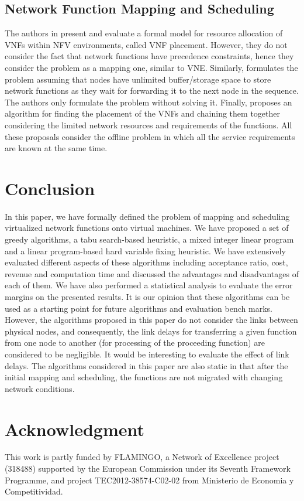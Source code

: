 \documentclass[conference]{IEEEtran}
\begin{document}
\subsection{Network Function Mapping and Scheduling}
The authors in \cite{moensvnf} present and evaluate a formal model for resource allocation of VNFs within NFV environments, called VNF placement. However, they do not consider the fact that network functions have precedence constraints, hence they consider the problem as a mapping one, similar to VNE. Similarly, \cite{FeRiera14} formulates the problem assuming that nodes have unlimited buffer/storage space to store network functions as they wait for forwarding it to the next node in the sequence. The authors only formulate the problem without solving it. Finally, \cite{SevilM14} proposes an algorithm for finding the placement of the VNFs and chaining them together considering the limited network resources and requirements of the functions. All these proposals consider the offline problem in which all the service requirements are known at the same time.
\section{Conclusion}\label{concl}
In this paper, we have formally defined the problem of mapping and scheduling virtualized network functions onto virtual machines. We have proposed a set of greedy algorithms, a tabu search-based heuristic, a mixed integer linear program and a linear program-based hard variable fixing heuristic. We have extensively evaluated different aspects of these algorithms including acceptance ratio, cost, revenue and computation time and discussed the advantages and disadvantages of each of them. We have also performed a statistical analysis to evaluate the error margins on the presented results. It is our opinion that these algorithms can be used as a starting point for future algorithms and evaluation bench marks. \\
\indent However, the algorithms proposed in this paper do not consider the links between physical nodes, and consequently, the link delays for transferring a given function from one node to another (for processing of the proceeding function) are considered to be negligible. It would be interesting to evaluate the effect of link delays. The algorithms considered in this paper are also static in that after the initial mapping and scheduling, the functions are not migrated with changing network conditions. 

\section*{Acknowledgment}
This work is partly funded by FLAMINGO, a Network of Excellence project (318488) supported by the European Commission under its Seventh Framework Programme, and project TEC2012-38574-C02-02 from Ministerio de Economia y Competitividad.



\end{document}
